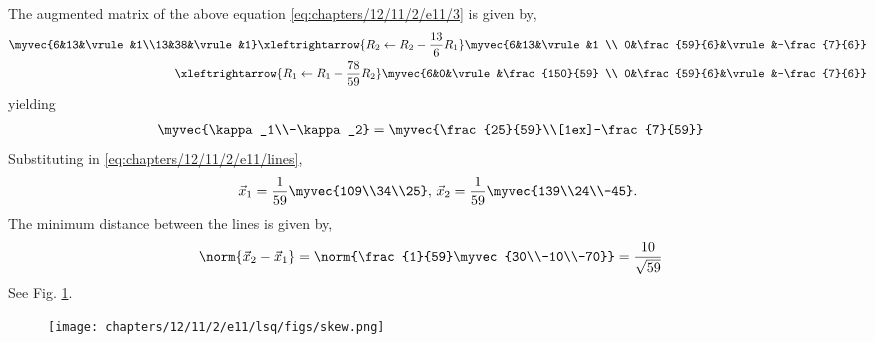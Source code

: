 The augmented matrix of the above equation \eqref{eq:chapters/12/11/2/e11/3} is given by,
\begin{align}
\myvec{6&13&\vrule&1\\13&38&\vrule&1}
\xleftrightarrow{R_2 \leftarrow R_2 - \frac{13}{6}R_1}
\myvec{6&13&\vrule&1 \\ 0&\frac{59}{6}&\vrule&-\frac{7}{6}}\\
\xleftrightarrow{R_1 \leftarrow R_1 - \frac{78}{59}R_2}
\myvec{6&0&\vrule&\frac{150}{59} \\ 0&\frac{59}{6}&\vrule&-\frac{7}{6}}
\end{align}
yielding
\begin{align}
	\myvec{\kappa_1\\-\kappa_2} &= \myvec{\frac{25}{59}\\[1ex]-\frac{7}{59}}
	\label{eq:chapters/12/11/2/e11/}
\end{align}
Substituting in \eqref{eq:chapters/12/11/2/e11/lines},
\begin{align}
\vec{x}_1 
= \frac{1}{59}\myvec{109\\34\\25},\,
\vec{x}_2 
= \frac{1}{59}\myvec{139\\24\\-45}.
\end{align}
The minimum distance between the lines is given by,
\begin{align}
\norm{\vec{x}_2-\vec{x}_1} &= \norm{\frac{1}{59}\myvec{30\\-10\\-70}}
= \frac{10}{\sqrt{59}}
\end{align}
See Fig. 
	\ref{fig:chapters/12/11/2/e11/}.
\begin{figure}[H]
\centering
\texttt{[image: chapters/12/11/2/e11/lsq/figs/skew.png]}
\caption{}
	\label{fig:chapters/12/11/2/e11/}
\end{figure}

